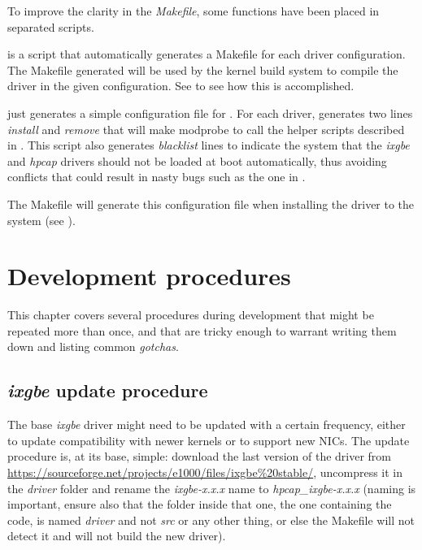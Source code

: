 \documentclass[oneside]{hpman}
\begin{document}
To improve the clarity in the \textit{Makefile}, some functions have been placed in separated scripts.

 is a script that automatically generates a Makefile for each driver configuration. The Makefile generated will be used by the kernel build system to compile the driver in the given configuration. See  to see how this is accomplished.

 just generates a simple configuration file for . For each driver, generates two lines \textit{install} and \textit{remove} that will make modprobe to call the helper scripts described in . This script also generates \textit{blacklist} lines to indicate the system that the \textit{ixgbe} and \textit{hpcap} drivers should not be loaded at boot automatically, thus avoiding conflicts that could result in nasty bugs such as the one in .

The Makefile will generate this configuration file when installing the driver to the system (see ).



\chapter{Development procedures}

This chapter covers several procedures during development that might be repeated more than once, and that are tricky enough to warrant writing them down and listing common \textit{gotchas}.

\section{\textit{ixgbe} update procedure}

The base \textit{ixgbe} driver might need to be updated with a certain frequency, either to update compatibility with newer kernels or to support new NICs. The update procedure is, at its base, simple: download the last version of the driver from \url{https://sourceforge.net/projects/e1000/files/ixgbe%20stable/}, uncompress it in the \textit{driver} folder and rename the \textit{ixgbe-x.x.x} name to \textit{hpcap\_ixgbe-x.x.x} (naming is important, ensure also that the folder inside that one, the one containing the code, is named \textit{driver} and not \textit{src} or any other thing, or else the Makefile will not detect it and will not build the new driver).
\end{document}
